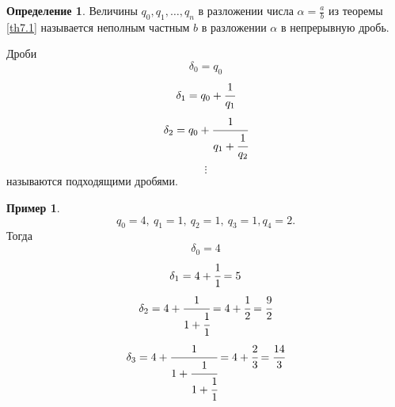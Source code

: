 \documentclass[a4paper, 12pt]{article}
\theoremstyle{definition}
\newtheorem{definition}{Определение}[section]
\newtheorem*{example}{Пример}
\begin{document}
    \begin{definition}
        Величины $q_0, q_1, \dots, q_n$ в разложении числа $\alpha=\frac{a}{b}$ из теоремы \ref{th7.1} называется неполным частным $b$ в разложении $\alpha$ в непрерывную дробь.
    \end{definition} 
        Дроби \[\delta_0=q_0\]
        \[\delta_1=q_0+\cfrac{1}{q_1}\] 
        \[\delta_2=q_0+\cfrac{1}{q_1+\cfrac{1}{q_2}}\]
        \[\vdots\]
    называются подходящими дробями.
    \begin{example}
    \[q_0=4,\ q_1=1,\ q_2=1,\ q_3=1, q_4=2.\]
    Тогда
    \[\delta_0=4\]
    \[\delta_1=4+\cfrac{1}{1}=5\]
    \[\delta_2=4+\cfrac{1}{1+\cfrac{1}{1}}=4+\cfrac{1}{2}=\cfrac{9}{2}\]
    \[\delta_3=4+\cfrac{1}{1+\cfrac{1}{1+\cfrac{1}{1}}}=4+\cfrac{2}{3}=\cfrac{14}{3}\]
    \end{example}
\end{document}
